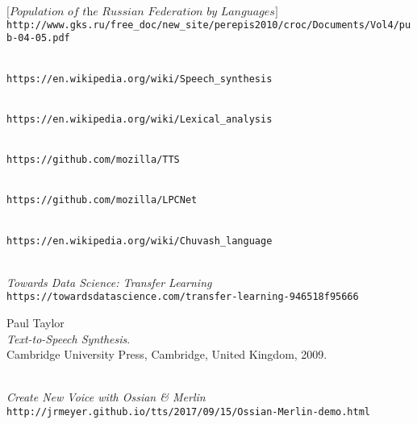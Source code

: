 \documentclass[fleqn,10pt]{SelfArx} %
\begin{document}
\newpage



\onecolumn

\begin{thebibliography}{9}
\\
$\big[ \textit{Population of the Russian Federation by Languages} \big]$\\
\texttt{http://www.gks.ru/free\_doc/new\_site/perepis2010/croc/Documents/Vol4/pub-04-05.pdf}

\\
\texttt{https://en.wikipedia.org/wiki/Speech\_synthesis}

\\
\texttt{https://en.wikipedia.org/wiki/Lexical\_analysis}

\\
\texttt{https://github.com/mozilla/TTS}

\\
\texttt{https://github.com/mozilla/LPCNet}

\\
\texttt{https://en.wikipedia.org/wiki/Chuvash\_language}

\\
\textit{Towards Data Science: Transfer Learning}\\
\texttt{https://towardsdatascience.com/transfer-learning-946518f95666}

Paul Taylor\\
\textit{Text-to-Speech Synthesis}.\\
Cambridge University Press, Cambridge, United Kingdom, 2009.

\\
\textit{Create New Voice with Ossian \& Merlin}\\
\texttt{http://jrmeyer.github.io/tts/2017/09/15/Ossian-Merlin-demo.html}


\end{thebibliography}
\end{document}
